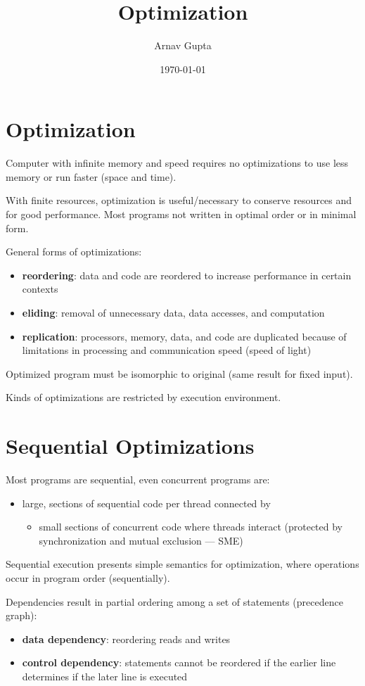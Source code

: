 \documentclass[11pt]{article}
\author{Arnav Gupta}
\date{\today}
\title{Optimization}
\begin{document}
\maketitle
\tableofcontents

\section{Optimization}
\label{sec:orgcd87bd1}
Computer with infinite memory and speed requires no optimizations to use less memory or run faster
(space and time).

With finite resources, optimization is useful/necessary to conserve resources and for good performance.
Most programs not written in optimal order or in minimal form.

General forms of optimizations:
\begin{itemize}
\item \textbf{reordering}: data and code are reordered to increase performance in certain contexts
\item \textbf{eliding}: removal of unnecessary data, data accesses, and computation
\item \textbf{replication}: processors, memory, data, and code are duplicated because of limitations in
processing and communication speed (speed of light)
\end{itemize}

Optimized program must be isomorphic to original (same result for fixed input).

Kinds of optimizations are restricted by execution environment.
\section{Sequential Optimizations}
\label{sec:org4736795}
Most programs are sequential, even concurrent programs are:
\begin{itemize}
\item large, sections of sequential code per thread connected by
\begin{itemize}
\item small sections of concurrent code where threads interact (protected by synchronization and mutual exclusion --- SME)
\end{itemize}
\end{itemize}

Sequential execution presents simple semantics for optimization, where operations occur in program
order (sequentially).

Dependencies result in partial ordering among a set of statements (precedence graph):
\begin{itemize}
\item \textbf{data dependency}: reordering reads and writes
\item \textbf{control dependency}: statements cannot be reordered if the earlier line determines if the later
line is executed
\end{itemize}
\end{document}
